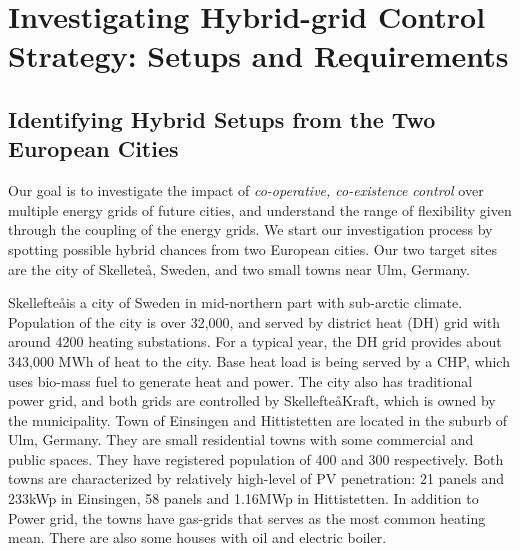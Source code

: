 \documentclass[conference]{IEEEtran}
\begin{document}
\section{Investigating Hybrid-grid Control Strategy: 
Setups and Requirements}
\label{sec:req}


\subsection{Identifying Hybrid Setups from the Two European Cities}
\label{sec:req-1}
Our goal is to investigate the impact of {\em co-operative,
  co-existence control} over multiple energy grids of future cities, 
and understand the range of flexibility given through the coupling of
the energy grids. 
We start our investigation process by spotting possible hybrid chances 
from two European cities. Our two target sites are the city of
Skellete\aa, Sweden, and two small towns near Ulm, Germany.  

Skellefte\aa is a city of Sweden in mid-northern part with sub-arctic
climate. Population of the city is over 32,000, and served by district
heat (DH) grid with around 4200 heating substations. For a typical
year, the DH grid provides about 343,000 MWh of heat to the
city. Base heat load is being served by a CHP, which uses bio-mass
fuel to generate heat and power. The city also has traditional power
grid, and both grids are controlled by Skellefte\aa Kraft, which is
owned by the municipality. 
Town of Einsingen and Hittistetten are located in the suburb of Ulm, 
Germany. They are small residential towns with some commercial and
public spaces. They have registered population of 400 and 300
respectively. Both towns are characterized by relatively high-level of 
PV penetration: 21 panels and 233kWp in Einsingen, 58 panels and 
1.16MWp in Hittistetten. In addition to Power grid, the towns have
gas-grids that serves as the most common heating mean. There are also 
some houses with oil and electric boiler.  
\end{document}
